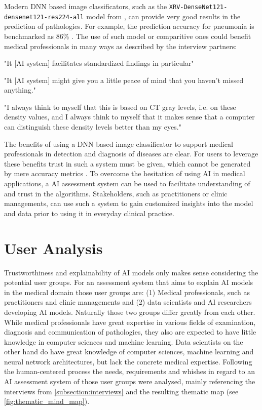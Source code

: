 \documentclass[11pt,a4paper,english]{scrreprt}
\begin{document}
Modern DNN based image classificators, such as the \texttt{XRV\--DenseNet121\--densenet121\--res224\--all} model from \textcite{cohen_limits_2020}, can provide very good results in the prediction of pathologies. For example, the prediction accuracy for pneumonia is benchmarked as 86\% \parencite{torchxrayvision_github}. The use of such model or comparitive ones could benefit medical professionals in many ways as described by the interview partners:
\begin{displayquote}
    "It [AI system] facilitates standardized findings in particular"
\end{displayquote}
\begin{displayquote}
    "It [AI system] might give you a little peace of mind that you haven't missed anything."
\end{displayquote}
\begin{displayquote}
    "I always think to myself that this is based on CT gray levels, i.e. on these density values, and I always think to myself that it makes sense that a computer can distinguish these density levels better than my eyes."
\end{displayquote}

The benefits of using a DNN based image classificator to support medical professionals in detection and diagnosis of diseases are clear. For users to leverage these benefits trust in such a system must be given, which cannot be generated by mere accuracy metrics \parencite{samek_explaining_2021}. To overcome the hesitation of using AI in medical applications, a AI assessment system can be used to facilitate understanding of and trust in the algorithms. Stakeholders, such as practitioners or clinic managements, can use such a system to gain customized insights into the model and data prior to using it in everyday clinical practice.

\section{User Analysis}\label{section:user_analysis}
Trustworthiness and explainability of AI models only makes sense considering the potential user groups. For an assessment system that aims to explain AI models in the medical domain those user groups are: (1) Medical professionals, such as practitioners and clinic managements and (2) data scientists and AI researchers developing AI models. Naturally those two groups differ greatly from each other. While medical professionals have great expertise in various fields of examination, diagnosis and communication of pathologies, they also are expected to have little knowledge in computer sciences and machine learning. Data scientists on the other hand do have great knowledge of computer sciences, machine learning and neural network architectures, but lack the concrete medical expertise. Following the human-centered process the needs, requirements and whishes in regard to an AI assessment system of those user groups were analysed, mainly referencing the interviews from \autoref{subsection:interviews} and the resulting thematic map (see \autoref{fig:thematic_mind_map}).
\end{document}

